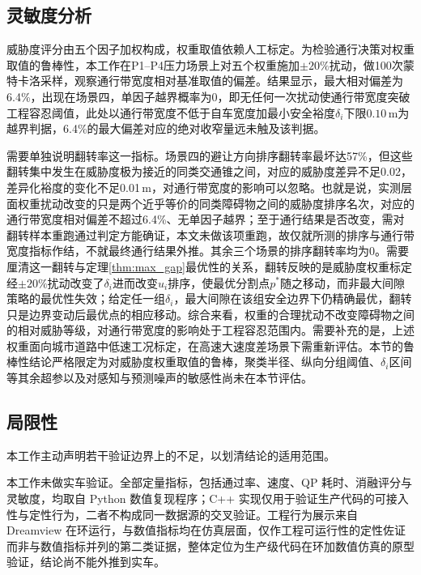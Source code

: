 \documentclass[a4paper,11pt]{ctexart}
\theoremstyle{definition}
\begin{document}
\subsection{灵敏度分析}
\label{subsec:exp_sensitivity}

威胁度评分由五个因子加权构成，权重取值依赖人工标定。为检验通行决策对权重取值的鲁棒性，本工作在P1--P4压力场景上对五个权重施加$\pm 20\%$扰动，做100次蒙特卡洛采样，观察通行带宽度相对基准取值的偏差。结果显示，最大相对偏差为6.4\%，出现在场景四，单因子越界概率为0，即无任何一次扰动使通行带宽度突破工程容忍阈值，此处以通行带宽度不低于自车宽度加最小安全裕度$\delta_i$下限$0.10$\,m为越界判据，6.4\%的最大偏差对应的绝对收窄量远未触及该判据。

需要单独说明翻转率这一指标。场景四的避让方向排序翻转率最坏达57\%，但这些翻转集中发生在威胁度极为接近的同类交通锥之间，对应的威胁度差异不足0.02，差异化裕度的变化不足0.01\,m，对通行带宽度的影响可以忽略。也就是说，实测层面权重扰动改变的只是两个近乎等价的同类障碍物之间的威胁度排序名次，对应的通行带宽度相对偏差不超过6.4\%、无单因子越界；至于通行结果是否改变，需对翻转样本重跑通过判定方能确证，本文未做该项重跑，故仅就所测的排序与通行带宽度指标作结，不就最终通行结果外推。其余三个场景的排序翻转率均为0。需要厘清这一翻转与定理\ref{thm:max_gap}最优性的关系，翻转反映的是威胁度权重标定经$\pm20\%$扰动改变了$\delta_i$进而改变$u_i$排序，使最优分割点$p^{*}$随之移动，而非最大间隙策略的最优性失效；给定任一组$\delta_i$，最大间隙在该组安全边界下仍精确最优，翻转只是边界变动后最优点的相应移动。综合来看，权重的合理扰动不改变障碍物之间的相对威胁等级，对通行带宽度的影响处于工程容忍范围内。需要补充的是，上述权重面向城市道路中低速工况标定，在高速大速度差场景下需重新评估。本节的鲁棒性结论严格限定为对威胁度权重取值的鲁棒，聚类半径、纵向分组阈值、$\delta_i$区间等其余超参以及对感知与预测噪声的敏感性尚未在本节评估。

\subsection{局限性}
\label{subsec:exp_limitations}

本工作主动声明若干验证边界上的不足，以划清结论的适用范围。

本工作未做实车验证。全部定量指标，包括通过率、速度、QP 耗时、消融评分与灵敏度，均取自 Python 数值复现程序；C++ 实现仅用于验证生产代码的可接入性与定性行为，二者不构成同一数据源的交叉验证。工程行为展示来自 Dreamview 在环运行，与数值指标均在仿真层面，仅作工程可运行性的定性佐证而非与数值指标并列的第二类证据，整体定位为生产级代码在环加数值仿真的原型验证，结论尚不能外推到实车。
\end{document}
